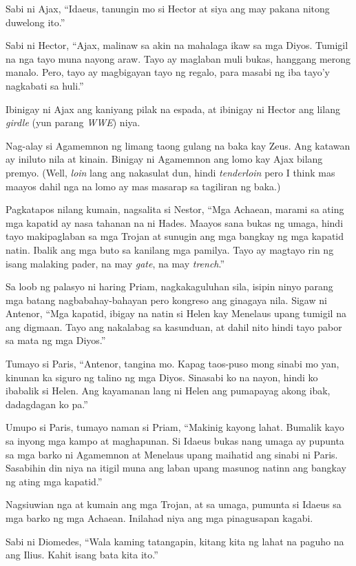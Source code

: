 \documentclass[12pt,letterpaper]{report}
\begin{document}
Sabi ni Ajax, ``Idaeus, tanungin mo si Hector at siya ang may pakana nitong duwelong ito.''

Sabi ni Hector, ``Ajax, malinaw sa akin na mahalaga ikaw sa mga Diyos. Tumigil na nga tayo muna nayong araw. Tayo ay maglaban muli bukas, hanggang merong manalo. Pero, tayo ay magbigayan tayo ng regalo, para masabi ng iba tayo'y nagkabati sa huli.''

Ibinigay ni Ajax ang kaniyang pilak na espada, at ibinigay ni Hector ang lilang \textit{girdle} (yun parang \textit{WWE}) niya.

Nag-alay si Agamemnon ng limang taong gulang na baka kay Zeus. Ang katawan ay iniluto nila at kinain. Binigay ni Agamemnon ang lomo kay Ajax bilang premyo. (Well, \textit{loin} lang ang nakasulat dun, hindi \textit{tenderloin} pero I think mas maayos dahil nga na lomo ay mas masarap sa tagiliran ng baka.)

Pagkatapos nilang kumain, nagsalita si Nestor, ``Mga Achaean, marami sa ating mga kapatid ay nasa tahanan na ni Hades. Maayos sana bukas ng umaga, hindi tayo makipaglaban sa mga Trojan at sunugin ang mga bangkay ng mga kapatid natin. Ibalik ang mga buto sa kanilang mga pamilya. Tayo ay magtayo rin ng isang malaking pader, na may \textit{gate}, na may \textit{trench}.''

Sa loob ng palasyo ni haring Priam, nagkakaguluhan sila, isipin ninyo parang mga batang nagbabahay-bahayan pero kongreso ang ginagaya nila. Sigaw ni Antenor, ``Mga kapatid, ibigay na natin si Helen kay Menelaus upang tumigil na ang digmaan. Tayo ang nakalabag sa kasunduan, at dahil nito hindi tayo pabor sa mata ng mga Diyos.''

Tumayo si Paris, ``Antenor, tangina mo. Kapag taos-puso mong sinabi mo yan, kinunan ka siguro ng talino ng mga Diyos. Sinasabi ko na nayon, hindi ko ibabalik si Helen. Ang kayamanan lang ni Helen ang pumapayag akong ibak, dadagdagan ko pa.''

Umupo si Paris, tumayo naman si Priam, ``Makinig kayong lahat. Bumalik kayo sa inyong mga kampo at maghapunan. Si Idaeus bukas nang umaga ay pupunta sa mga barko ni Agamemnon at Menelaus upang maihatid ang sinabi ni Paris. Sasabihin din niya na itigil muna ang laban upang masunog natinn ang bangkay ng ating mga kapatid.''

Nagsiuwian nga at kumain ang mga Trojan, at sa umaga, pumunta si Idaeus sa mga barko ng mga Achaean. Inilahad niya ang mga pinagusapan kagabi.

Sabi ni Diomedes, ``Wala kaming tatangapin, kitang kita ng lahat na paguho na ang Ilius. Kahit isang bata kita ito.''
\end{document}
